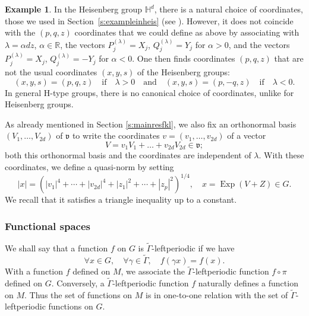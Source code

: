 \documentclass[10pt]{amsart}
\DeclareMathOperator{\Exp}{Exp}
\theoremstyle{plain}
\theoremstyle{definition}
\newtheorem{example}[theorem]{Example}
\def\R{{\mathbb R}}
\def\bbH{{\mathbb H}}
\begin{document}
\begin{example}\label{ex:Heisenberg1}
In the Heisenberg group $\bbH^d$, there is a natural choice of coordinates, those we used in Section~\ref{s:exampleinheis} (see \cite[Chap.\,1]{Tay}). However, it does not coincide with the $(p,q,z)$ coordinates that we could define as above by associating with $\lambda=\alpha dz$, $\alpha\in\R$,
the vectors $P_j^{(\lambda)}=X_j$, $Q_j^{(\lambda)}=Y_j$ for $\alpha>0$,
and the vectors $P_j^{(\lambda)}=X_j$, $Q_j^{(\lambda)}=-Y_j$ for $\alpha<0$. One then finds coordinates
$(p,q,z)$ that are not the usual coordinates $(x,y,s)$ of the Heisenberg groups:
\begin{equation}\label{change:var}
(x,y,s)=(p,q,z)\quad \text{if} \quad \lambda>0\quad \text{and} \quad (x,y,s)= (p,-q,z)\quad \text{if} \quad \lambda<0.
\end{equation}
In general H-type groups, there is no canonical choice of coordinates, unlike for Heisenberg groups.
\end{example}

As already mentioned in Section \ref{s:mainresfkl}, we also fix an orthonormal basis $(V_1,\ldots, V_{2d})$ of $\mathfrak v$ to write the coordinates $
v=(v_1,\ldots,v_{2d})$ of a vector
\[
V=v_1V_1 +\ldots + v_{2d} V_{2d}\in \mathfrak v;
\]
both this orthonormal basis and the coordinates are
independent of $\lambda$.
With these coordinates, we define a quasi-norm by setting
\begin{equation}\label{def:quasinorm}
|x|= \left(|v_1|^4 + \cdots +|v_{2d}|^4 + |z_1|^2 + \cdots + |z_p|^2\right)^{1/4},\quad x= \Exp (V+Z)\in G.
\end{equation}
We recall that it satisfies a triangle inequality up to a constant.

\subsubsection{Functional spaces}
We shall say that a function $f$ on $G$ is $\widetilde{\Gamma}$-leftperiodic if we have
\[
\forall x\in G,\quad \forall \gamma\in \widetilde{\Gamma},\quad f(\gamma x)=f(x).
\]
With a function $f$ defined on $M$, we associate the $\widetilde{\Gamma}$-leftperiodic function $f\circ \pi$ defined on $G$. Conversely, a
$\widetilde{\Gamma}$-leftperiodic function $f$ naturally defines a function on $M$. Thus the set of functions on $M$ is in one-to-one relation with the set of $\widetilde{\Gamma}$-leftperiodic functions on $G$.
\end{document}

